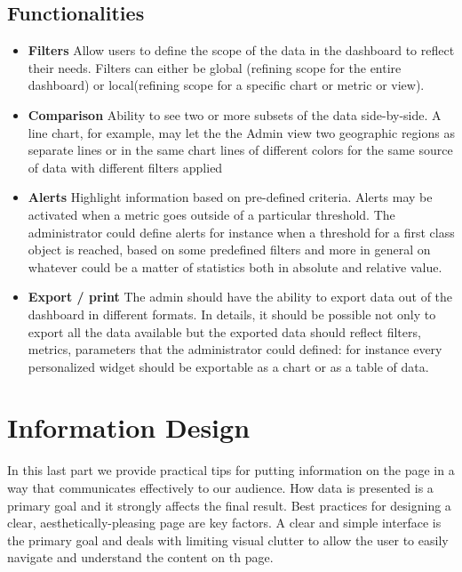 \documentclass[a4paper,13pt]{report}
\begin{document}
\subsection{Functionalities}
\begin{itemize}
\item \textbf{Filters}\newline
Allow users to define the scope of the data in the dashboard to reflect their needs. Filters can either be global (refining scope for the entire dashboard) or local(refining scope for a specific chart or metric or view).

\item \textbf{Comparison}\newline
Ability to see two or more subsets of the data side-by-side. A line chart, for example, may let the the Admin view two geographic regions as separate lines or in the same chart lines of different colors for the same source of data with different filters applied

\item \textbf{Alerts}\newline
Highlight information based on pre-defined criteria. Alerts may be activated when a metric goes outside of a particular threshold.  The administrator could define alerts for instance when a threshold for a first class object is reached, based on some predefined filters and more in general on whatever could be a matter of statistics both in absolute and relative value.

\item \textbf{Export / print}\newline
The  admin should have the ability to export data out of the dashboard in different formats. In details, it should be possible not only to export all the data available but the exported data should reflect filters, metrics, parameters that the administrator could defined: for instance every personalized widget should be exportable as a chart or as a table of data.
\end{itemize}

\section{Information Design}
In this last part we provide practical tips for putting information on the page in a way that communicates effectively to our audience. How data is presented is a primary goal and it strongly affects the final result. Best practices for designing a clear, aesthetically-pleasing page are key factors.\newline
A clear and simple interface is the primary goal and deals with limiting visual clutter to allow the user to easily navigate and understand the content on th page.
\end{document}

